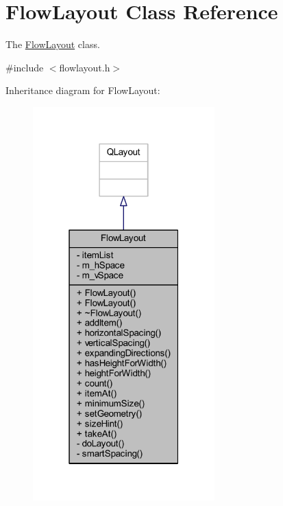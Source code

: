 \hypertarget{class_flow_layout}{\section{Flow\+Layout Class Reference}
\label{class_flow_layout}
}


The \hyperlink{class_flow_layout}{Flow\+Layout} class.  




{\ttfamily \#include $<$flowlayout.\+h$>$}



Inheritance diagram for Flow\+Layout\+:
\nopagebreak
\begin{figure}[H]
\begin{center}
\leavevmode
\includegraphics[width=199pt]{class_flow_layout__inherit__graph}
\end{center}
\end{figure}


